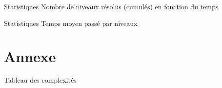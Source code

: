         \begin{frame}{Statistiques}
            \centering
            Nombre de niveaux résolus (cumulés) en fonction du temps

            \vspace{0.4cm}
            
        \end{frame}

        \begin{frame}{Statistiques}
            Temps moyen passé par niveaux
        \end{frame}


    \section{Annexe}
        \begin{frame}{Tableau des complexités}

        \end{frame}

